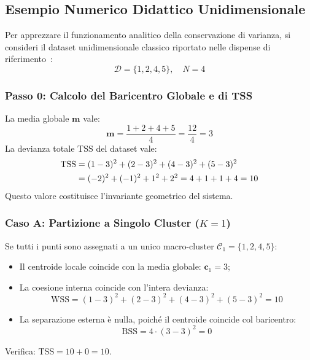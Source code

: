 \FloatBarrier
\subsection{Esempio Numerico Didattico Unidimensionale}
Per apprezzare il funzionamento analitico della conservazione di varianza, si consideri il dataset unidimensionale classico riportato nelle dispense di riferimento~\cite{tan2018}:
\begin{equation}
\mathcal{D} = \{1, 2, 4, 5\}, \quad N = 4
\end{equation}

\subsubsection{Passo 0: Calcolo del Baricentro Globale e di TSS}
La media globale $\mathbf{m}$ vale:
\begin{equation}
\mathbf{m} = \frac{1 + 2 + 4 + 5}{4} = \frac{12}{4} = 3
\end{equation}
La devianza totale $\mathrm{TSS}$ del dataset vale:
\begin{align}
\mathrm{TSS} &= (1 - 3)^2 + (2 - 3)^2 + (4 - 3)^2 + (5 - 3)^2 \notag \\
&= (-2)^2 + (-1)^2 + 1^2 + 2^2 = 4 + 1 + 1 + 4 = 10
\end{align}
Questo valore costituisce l'invariante geometrico del sistema.

\subsubsection{Caso A: Partizione a Singolo Cluster ($K=1$)}
Se tutti i punti sono assegnati a un unico macro-cluster $\mathcal{C}_1 = \{1, 2, 4, 5\}$:
\begin{itemize}[noitemsep]
    \item Il centroide locale coincide con la media globale: $\mathbf{c}_1 = 3$;
    \item La coesione interna coincide con l'intera devianza:
    \begin{equation}
    \mathrm{WSS} = (1-3)^2 + (2-3)^2 + (4-3)^2 + (5-3)^2 = 10
    \end{equation}
    \item La separazione esterna è nulla, poiché il centroide coincide col baricentro:
    \begin{equation}
    \mathrm{BSS} = 4 \cdot (3 - 3)^2 = 0
    \end{equation}
\end{itemize}
Verifica: $\mathrm{TSS} = 10 + 0 = 10$.


